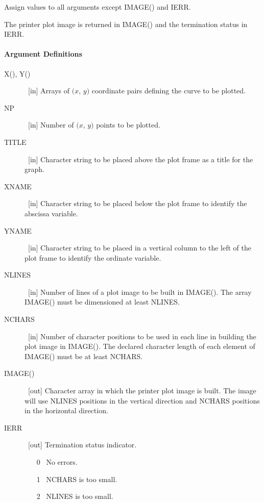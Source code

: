 \documentclass[twoside]{MATH77}
\begin{document}
Assign values to all arguments except IMAGE() and IERR.

\begin{center}
\end{center}

The printer plot image is returned in IMAGE() and the termination status in
IERR.

\paragraph{Argument Definitions}

\begin{description}

\item[X(), Y()] \ [in] Arrays of $(x$, $y)$ coordinate pairs defining the curve
to be plotted.

\item[NP] \ [in] Number of $(x$, $y)$ points to be plotted.

\item[TITLE] \ [in] Character string to be placed above the plot frame as a
title for the graph.

\item[XNAME] \ [in] Character string to be placed below the plot frame to
identify the abscissa variable.

\item[YNAME] \ [in] Character string to be placed in a vertical column to the
left of the plot frame to identify the ordinate variable.

\item[NLINES] \ [in] Number of lines of a plot image to be built in IMAGE().
The array IMAGE() must be dimensioned at least NLINES.

\item[NCHARS] \ [in] Number of character positions to be used in each line in
building the plot image in IMAGE(). The declared character length of each
element of IMAGE() must be at least NCHARS.

\item[IMAGE()] \ [out] Character array in which the printer plot image is
built. The image will use NLINES positions in the vertical direction and
NCHARS positions in the horizontal direction.

\item[IERR] \ [out] Termination status indicator.
\begin{itemize}
\item[0] \ No errors.
\item[1] \ NCHARS is too small.
\item[2] \ NLINES is too small.
\end{itemize}
\end{description}
\end{document}
